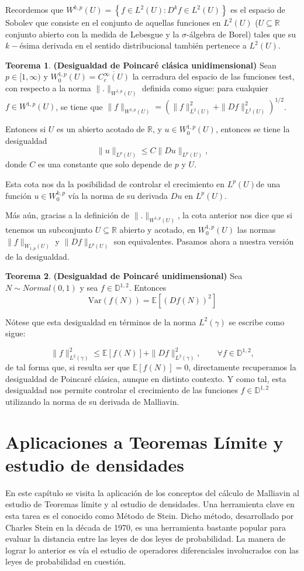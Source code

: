 \documentclass[letterpaper,twoside]{book}
\newcommand{\R}{\mathbb{R}}
\newcommand{\D}{\mathbb{D}}
\newcommand{\E}{\mathbb{E}}
\newcommand{\1}{\mathds{1}}
\theoremstyle{definition}
\theoremstyle{definition}
\newtheorem{teo}{Teorema}
\theoremstyle{definition}
\theoremstyle{definition}
\theoremstyle{definition}
\theoremstyle{definition}
\theoremstyle{definition}
\begin{document}
 Recordemos que $W^{k,p}(U)=\left\{f\in L^{2}(U): D^kf\in L^2(U)\right\}$ es el espacio de Sobolev que consiste en el conjunto de aquellas funciones en $L^2(U)$ ($U\subseteq \R$ conjunto abierto con la medida de Lebesgue y la $\sigma$-álgebra de Borel) tales que su $k-$ésima derivada en el sentido distribucional también pertenece a $L^2(U)$.

 \begin{teo}\textbf{(Desigualdad de Poincaré clásica unidimensional)}
    Sean $p\in [1,\infty)$ y $W_0^{1,p}(U)=\overline{C^{\infty}_c(U)}$ la cerradura del espacio de las funciones test, con respecto a la norma $\|.\|_{W^{1,p}(U)}$ definida como sigue: para cualquier $f\in W^{1,p}(U)$, se tiene que $\|f\|_{W^{1,p}(U)}=\left(\|f\|_{L^{2}(U)}^2+\|Df\|_{L^2(U)}^2\right)^{1/2}$.

    Entonces si $U$ es un abierto acotado de $\R$, y $u\in W_0^{1,p}(U)$, entonces se tiene la desigualdad 
    \[
    \|u\|_{L^{p}(U)}\leq C\|Du\|_{L^p(U)},   
    \]
    donde $C$ es una constante que solo depende de $p$ y $U$. 
    \end{teo}
    Esta cota nos da la posibilidad de controlar el crecimiento en $L^p(U)$de una función $u\in W_0^{k,p}$ vía la norma de su derivada $Du$ en $L^p(U)$.

    Más aún, gracias a la definición de $\|.\|_{W^{1,p}(U)}$, la cota anterior nos dice que si tenemos un subconjunto $U\subseteq \R$ abierto y acotado, en $W_0^{1,p}(U)$ las normas $\|f\|_{W_{1,p}(U)}$ y $\|Df\|_{L^p(U)}$ son equivalentes. Pasamos ahora a nuestra versión de la desigualdad.
    \begin{teo} \textbf{(Desigualdad de Poincaré unidimensional)} Sea $N\sim Normal(0,1)$ y sea $f\in \D^{1,2}$. Entonces
        \[
        \text{Var}\left(f(N)\right)=\E\left[(Df(N))^2\right]    
        \]     
     \end{teo}
Nótese que esta desigualdad en términos de la norma $L^2(\gamma)$ se escribe como sigue:

\[
\|f\|^2_{L^2(\gamma)}\leq \E\left[f(N)\right]+\|Df\|^2_{L^2(\gamma)}, \qquad \forall f\in \D^{1,2},
\]
de tal forma que, si resulta ser que $\E\left[f(N)\right]=0$, directamente recuperamos la desigualdad de Poincaré clásica, aunque en distinto contexto. Y como tal, esta desigualdad nos permite controlar el crecimiento de las funciones $f\in \D^{1,2}$ utilizando la norma de su derivada de Malliavin.

\chapter{Aplicaciones a Teoremas Límite y estudio de densidades}
En este capítulo se visita la aplicación de los conceptos del cálculo de Malliavin al estudio de Teoremas límite y al estudio de densidades. 
Una herramienta clave en esta tarea es el conocido como Método de Stein. 
Dicho método, desarrollado por Charles Stein en la década de 1970, es una herramienta bastante popular para evaluar la distancia entre las leyes de dos leyes de probabilidad. La manera de lograr lo anterior es vía el estudio de operadores diferenciales involucrados con las leyes de probabilidad en cuestión.
\end{document}
